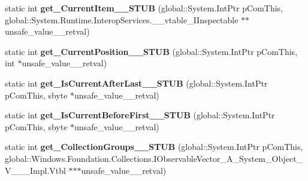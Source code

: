 \begin{DoxyCompactItemize}
static int {\bfseries get\+\_\+\+Current\+Item\+\_\+\+\_\+\+S\+T\+UB} (global\+::\+System.\+Int\+Ptr p\+Com\+This, global\+::\+System.\+Runtime.\+Interop\+Services.\+\_\+\+\_\+vtable\+\_\+\+I\+Inspectable $\ast$$\ast$unsafe\+\_\+value\+\_\+\+\_\+retval)
\item 
\mbox{\label{struct_windows_1_1_u_i_1_1_xaml_1_1_data_1_1_i_collection_view_____impl_1_1_vtbl_af335c7717f8ae12c3241c2e5417e9d37}} 
static int {\bfseries get\+\_\+\+Current\+Position\+\_\+\+\_\+\+S\+T\+UB} (global\+::\+System.\+Int\+Ptr p\+Com\+This, int $\ast$unsafe\+\_\+value\+\_\+\+\_\+retval)
\item 
\mbox{\label{struct_windows_1_1_u_i_1_1_xaml_1_1_data_1_1_i_collection_view_____impl_1_1_vtbl_a5dfdf621c1cce5486a1833879acc6785}} 
static int {\bfseries get\+\_\+\+Is\+Current\+After\+Last\+\_\+\+\_\+\+S\+T\+UB} (global\+::\+System.\+Int\+Ptr p\+Com\+This, sbyte $\ast$unsafe\+\_\+value\+\_\+\+\_\+retval)
\item 
\mbox{\label{struct_windows_1_1_u_i_1_1_xaml_1_1_data_1_1_i_collection_view_____impl_1_1_vtbl_aec02e603fdba0583cfcf5bc039d82490}} 
static int {\bfseries get\+\_\+\+Is\+Current\+Before\+First\+\_\+\+\_\+\+S\+T\+UB} (global\+::\+System.\+Int\+Ptr p\+Com\+This, sbyte $\ast$unsafe\+\_\+value\+\_\+\+\_\+retval)
\item 
\mbox{\label{struct_windows_1_1_u_i_1_1_xaml_1_1_data_1_1_i_collection_view_____impl_1_1_vtbl_a0c0e03b6849e9f9c499aa5e1c79c40c2}} 
static int {\bfseries get\+\_\+\+Collection\+Groups\+\_\+\+\_\+\+S\+T\+UB} (global\+::\+System.\+Int\+Ptr p\+Com\+This, global\+::\+Windows.\+Foundation.\+Collections.\+I\+Observable\+Vector\+\_\+\+A\+\_\+\+System\+\_\+\+Object\+\_\+\+V\+\_\+\+\_\+\+\_\+\+Impl.\+Vtbl $\ast$$\ast$$\ast$unsafe\+\_\+value\+\_\+\+\_\+retval)
\item 
\mbox{\label{struct_windows_1_1_u_i_1_1_xaml_1_1_data_1_1_i_collection_view_____impl_1_1_vtbl_a4d0a63b9203787ac905f828cba617214}} 
$$
\end{DoxyCompactItemize}

